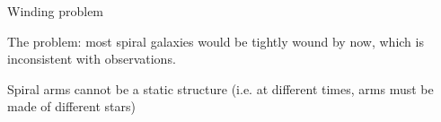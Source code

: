 \documentclass[letterpaper,landscape]{slides}
\begin{document}

\begin{slide}
\begin{center}
{\large \color{red} Winding problem }
\end{center}

\begin{center}


{\color{blue} The problem: most spiral galaxies would be tightly
wound by now}, which is inconsistent with observations. 

{\color{blue} Spiral
arms cannot be a static structure} (i.e. at different times, arms
must be made of different stars)

\end{center}

\vfill
\end{slide}



%
%
%
%
%
\end{document}
